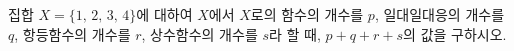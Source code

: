 집합 $X=\{1,\,2,\,3,\,4\}$에 대하여 $X$에서 $X$로의 함수의 개수를 $p$, 일대일대응의 개수를 $q$, 항등함수의 개수를 $r$, 상수함수의 개수를 $s$라 할 때, $p+q+r+s$의 값을 구하시오.

